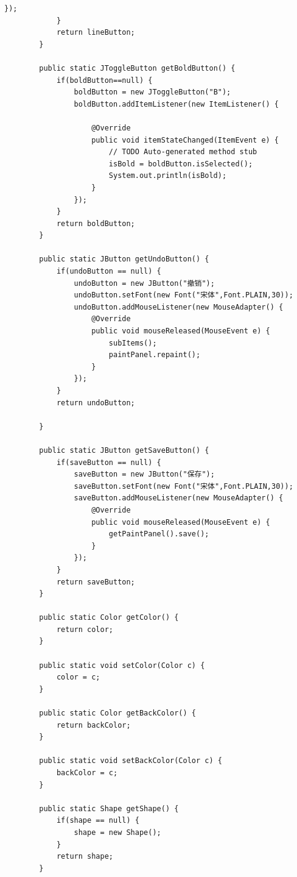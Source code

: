 \documentclass{ctexart}
\begin{document}
\begin{lstlisting}[caption = Vars.Java]
                });
            }
            return lineButton;
        }

        public static JToggleButton getBoldButton() {
            if(boldButton==null) {
                boldButton = new JToggleButton("B");
                boldButton.addItemListener(new ItemListener() {
                    
                    @Override
                    public void itemStateChanged(ItemEvent e) {
                        // TODO Auto-generated method stub
                        isBold = boldButton.isSelected();
                        System.out.println(isBold);
                    }
                });
            }
            return boldButton;
        }

        public static JButton getUndoButton() {
            if(undoButton == null) {
                undoButton = new JButton("撤销");
                undoButton.setFont(new Font("宋体",Font.PLAIN,30));
                undoButton.addMouseListener(new MouseAdapter() {
                    @Override
                    public void mouseReleased(MouseEvent e) {
                        subItems();
                        paintPanel.repaint();
                    }
                });
            }
            return undoButton;
            
        }

        public static JButton getSaveButton() {
            if(saveButton == null) {
                saveButton = new JButton("保存");
                saveButton.setFont(new Font("宋体",Font.PLAIN,30));
                saveButton.addMouseListener(new MouseAdapter() {
                    @Override
                    public void mouseReleased(MouseEvent e) {
                        getPaintPanel().save();
                    }
                });
            }
            return saveButton;
        }

        public static Color getColor() {
            return color;
        }

        public static void setColor(Color c) {
            color = c;
        }

        public static Color getBackColor() {
            return backColor;
        }

        public static void setBackColor(Color c) {
            backColor = c;
        }

        public static Shape getShape() {
            if(shape == null) {
                shape = new Shape();
            }
            return shape;
        }


\end{lstlisting}
\end{document}
